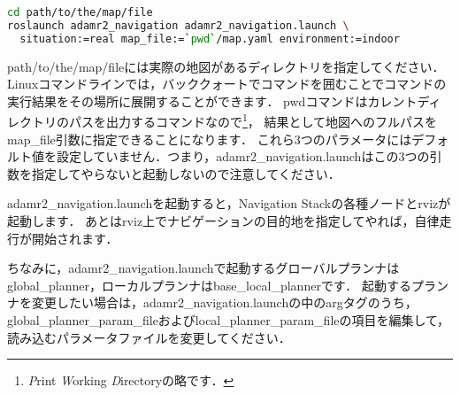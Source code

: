 \documentclass[{../../master}]{subfiles}
\begin{document}
\begin{lstlisting}[language=sh, label=code:launch_adamr2_navigation, caption=Launch \textsf{adamr2\_navigation.launch}]
cd path/to/the/map/file
roslaunch adamr2_navigation adamr2_navigation.launch \
  situation:=real map_file:=`pwd`/map.yaml environment:=indoor
\end{lstlisting}

\textsf{path/to/the/map/file}には実際の地図があるディレクトリを指定してください．
Linuxコマンドラインでは，バッククォートでコマンドを囲むことでコマンドの実行結果をその場所に展開することができます．
\textsf{pwd}コマンドはカレントディレクトリのパスを出力するコマンドなので\footnote{\emph{P}rint \emph{W}orking \emph{D}irectoryの略です．}，
結果として地図へのフルパスを\textsf{map\_file}引数に指定できることになります．
これら3つのパラメータにはデフォルト値を設定していません．つまり，\textsf{adamr2\_navigation.launch}はこの3つの引数を指定してやらないと起動しないので注意してください．

\textsf{adamr2\_navigation.launch}を起動すると，Navigation Stackの各種ノードと\textsf{rviz}が起動します．
あとは\textsf{rviz}上でナビゲーションの目的地を指定してやれば，自律走行が開始されます．

ちなみに，\textsf{adamr2\_navigation.launch}で起動するグローバルプランナは\textsf{global\_planner}，ローカルプランナは\textsf{base\_local\_planner}です．
起動するプランナを変更したい場合は，\textsf{adamr2\_navigation.launch}の中の\textsf{arg}タグのうち，\textsf{global\_planner\_param\_file}および\textsf{local\_planner\_param\_file}の項目を編集して，読み込むパラメータファイルを変更してください．
\end{document}
